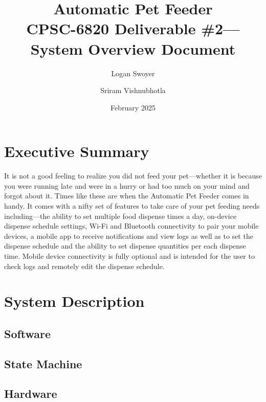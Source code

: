\documentclass{article}
\title{Automatic Pet Feeder\\
\large CPSC-6820 Deliverable \#2---System Overview Document}
\author{Logan Swoyer \and Sriram Vishnubhotla}
\date{February 2025}
\begin{document}
\maketitle

\section{Executive Summary}
It is not a good feeling to realize you did not feed your pet---whether it is because you were running late and were in a hurry or had too much on your mind and forgot about it. Times like these are when the Automatic Pet Feeder comes in handy. It comes with a nifty set of features to take care of your pet feeding needs including---the ability to set multiple food dispense times a day, on-device dispense schedule settings, Wi-Fi and Bluetooth connectivity to pair your mobile devices, a mobile app to receive notifications and view logs as well as to set the dispense schedule and the ability to set dispense quantities per each dispense time. Mobile device connectivity is fully optional and is intended for the user to check logs and remotely edit the dispense schedule.

\section{System Description}
\subsection{Software}
\subsection{State Machine}
\subsection{Hardware}
\end{document}
